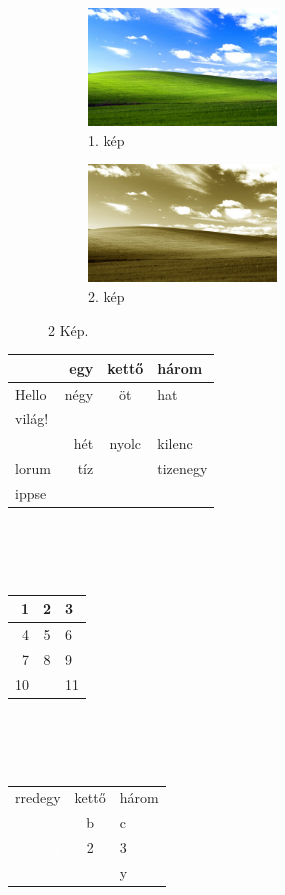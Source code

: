 \documentclass{article}
\begin{document}
\begin{figure}[b]
  \centering
  \begin{subfigure}{0.45\textwidth}
    \includegraphics[width=5cm]{kep.jpg}
    \caption{1. kép}
    \label{fig:subfig1}
  \end{subfigure}
  \begin{subfigure}{0.45\textwidth}
    \includegraphics[angle=10, width=5cm]{kep2.jpg}
    \caption{2. kép}
    \label{fig:subfig2}
  \end{subfigure}
  \caption{2 Kép.}
  \label{fig:mainfig}
\end{figure}
\begin{tabular}{l||r|c|l|}
{} & egy & kettő & három\\
\hline
\hline
Hello & négy & öt & hat\\
világ! & {} & {} & {}\\
\cline{2-4}
{} & hét & nyolc & kilenc\\
\cline{2-2} \cline{4-4}
lorum & tíz & {} & tizenegy\\
ippse & {} & {} & {}\\
\hline
\end{tabular}
\\
\\
\\
\begin{tabular}{r|c|l}
1 & 2 & 3\\
\hline
\rowcolor{yellow}
4 & 5 & 6\\
\rowcolor{green}
7 & 8 & 9\\
\rowcolor{blue}
10 & {} & 11\\
\end{tabular}
\\
\\
\\
\begin{tabular}{r|cl}
\cellcolor{black}r{red}{egy} & kettő & három\\
\arrayrulecolor{green}
\hline	
\cellcolor{black}\textcolor{white}{a} & b & c\\
\cellcolor{black}\textcolor{white}{1} & 2 & \cellcolor{blue}3\\
\cellcolor{brown}\textcolor{white}{x} & {} & y\\
\end{tabular}
\end{document}
